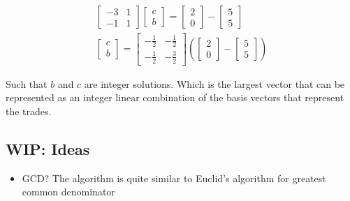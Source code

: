 \documentclass[letterpaper, 12pt]{article}
\begin{document}
\begin{align*}
\begin{bmatrix}
	-3 & 1\\
	-1 & 1	
\end{bmatrix}
\begin{bmatrix}
	c\\
	b
\end{bmatrix}
=
\begin{bmatrix}
	2\\
	0
\end{bmatrix}
 - 
\begin{bmatrix}
	5\\
	5
\end{bmatrix}
\\
\begin{bmatrix}
	c\\
	b
\end{bmatrix}
=
\begin{bmatrix}
	-\frac{1}{2} & -\frac{1}{2}\\
	-\frac{1}{2} & -\frac{3}{2}
\end{bmatrix}
(
\begin{bmatrix}
	2\\
	0
\end{bmatrix}
 - 
\begin{bmatrix}
	5\\
	5
\end{bmatrix}
)
\end{align*}
\par Such that $b$ and $c$ are integer solutions.
Which is the largest vector that can be represented as an integer linear combination of the basis vectors that represent the trades.
\subsection{WIP: Ideas}
\begin{itemize}
	\item GCD? The algorithm is quite similar to Euclid's algorithm for greatest common denominator
\end{itemize}
\end{document}
